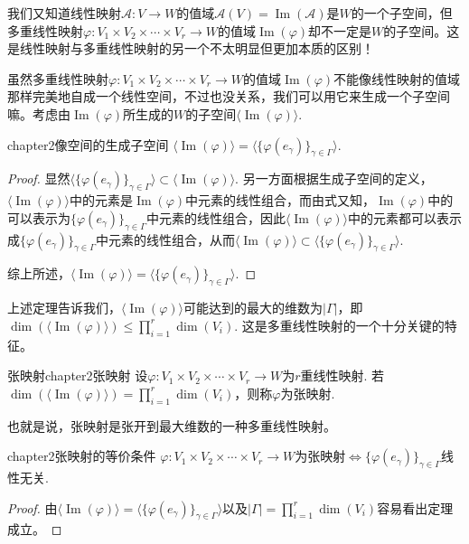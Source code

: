 我们又知道线性映射$\mathscr{A}:V\longrightarrow W$的值域$\mathscr{A}(V)=\operatorname{Im}(\mathscr{A})$是$W$的一个子空间，但多重线性映射$\varphi:V_{1}\times V_{2}\times\cdots\times V_{r}\longrightarrow W$的值域$\operatorname{Im}(\varphi)$却不一定是$W$的子空间。这是线性映射与多重线性映射的另一个不太明显但更加本质的区别！

虽然多重线性映射$\varphi:V_{1}\times V_{2}\times\cdots\times V_{r}\longrightarrow W$的值域$\operatorname{Im}(\varphi)$不能像线性映射的值域那样完美地自成一个线性空间，不过也没关系，我们可以用它来生成一个子空间嘛。考虑由$\operatorname{Im}(\varphi)$所生成的$W$的子空间$\langle\operatorname{Im}(\varphi) \rangle$. 
\begin{mythm}{}{chapter2像空间的生成子空间}
	$\langle\operatorname{Im}(\varphi) \rangle=\langle\{\varphi(e_{\gamma}) \}_{\gamma\in \Gamma} \rangle $.
\end{mythm}
\begin{proof}
	显然$\langle\{\varphi(e_{\gamma}) \}_{\gamma\in \Gamma} \rangle \subset \langle\operatorname{Im}(\varphi) \rangle$. 另一方面根据生成子空间的定义，$\langle\operatorname{Im}(\varphi) \rangle$中的元素是$\operatorname{Im}(\varphi)$中元素的线性组合，而由式又知，$\operatorname{Im}(\varphi)$中的可以表示为$\{\varphi(e_{\gamma}) \}_{\gamma\in \Gamma}$中元素的线性组合，因此$\langle\operatorname{Im}(\varphi) \rangle$中的元素都可以表示成$\{\varphi(e_{\gamma}) \}_{\gamma\in \Gamma}$中元素的线性组合，从而$\langle\operatorname{Im}(\varphi) \rangle\subset\langle\{\varphi(e_{\gamma}) \}_{\gamma\in \Gamma} \rangle $. 
	
	综上所述，$\langle\operatorname{Im}(\varphi) \rangle=\langle\{\varphi(e_{\gamma}) \}_{\gamma\in \Gamma} \rangle $.
\end{proof}

上述定理告诉我们，$\langle\operatorname{Im}(\varphi) \rangle$可能达到的最大的维数为$|\Gamma|$，即$\operatorname{dim}(\langle\operatorname{Im}(\varphi) \rangle)\leqslant \prod_{i=1}^{r}\operatorname{dim}(V_{i})$. 这是多重线性映射的一个十分关键的特征。

\begin{mydef}{张映射}{chapter2张映射}
	设$\varphi:V_{1}\times V_{2}\times\cdots\times V_{r}\longrightarrow W$为$r$重线性映射. 若$\operatorname{dim}(\langle\operatorname{Im}(\varphi) \rangle)= \prod_{i=1}^{r}\operatorname{dim}(V_{i})$，则称$\varphi$为张映射.
\end{mydef}

也就是说，张映射是张开到最大维数的一种多重线性映射。
\begin{mythm}{}{chapter2张映射的等价条件}
	$\varphi:V_{1}\times V_{2}\times\cdots\times V_{r}\longrightarrow W$为张映射$\Leftrightarrow\{\varphi(e_{\gamma}) \}_{\gamma\in \Gamma}$线性无关.
\end{mythm}
\begin{proof}
	由$\langle\operatorname{Im}(\varphi) \rangle=\langle\{\varphi(e_{\gamma}) \}_{\gamma\in \Gamma} \rangle $以及$|\Gamma|=\prod_{i=1}^{r}\operatorname{dim}(V_{i})$容易看出定理成立。
\end{proof}

